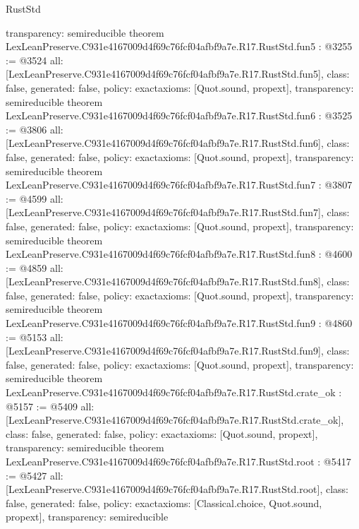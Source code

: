 \begin{lexlean}{RustStd}
\begin{coremodule}
{  transparency: semireducible
}
theorem LexLeanPreserve.C931e4167009d4f69c76fcf04afbf9a7e.R17.RustStd.fun5 : @3255 := @3524 {
  all: [LexLeanPreserve.C931e4167009d4f69c76fcf04afbf9a7e.R17.RustStd.fun5],
  class: false,
  generated: false,
  policy: exact{axioms: [Quot.sound, propext]},
  transparency: semireducible
}
theorem LexLeanPreserve.C931e4167009d4f69c76fcf04afbf9a7e.R17.RustStd.fun6 : @3525 := @3806 {
  all: [LexLeanPreserve.C931e4167009d4f69c76fcf04afbf9a7e.R17.RustStd.fun6],
  class: false,
  generated: false,
  policy: exact{axioms: [Quot.sound, propext]},
  transparency: semireducible
}
theorem LexLeanPreserve.C931e4167009d4f69c76fcf04afbf9a7e.R17.RustStd.fun7 : @3807 := @4599 {
  all: [LexLeanPreserve.C931e4167009d4f69c76fcf04afbf9a7e.R17.RustStd.fun7],
  class: false,
  generated: false,
  policy: exact{axioms: [Quot.sound, propext]},
  transparency: semireducible
}
theorem LexLeanPreserve.C931e4167009d4f69c76fcf04afbf9a7e.R17.RustStd.fun8 : @4600 := @4859 {
  all: [LexLeanPreserve.C931e4167009d4f69c76fcf04afbf9a7e.R17.RustStd.fun8],
  class: false,
  generated: false,
  policy: exact{axioms: [Quot.sound, propext]},
  transparency: semireducible
}
theorem LexLeanPreserve.C931e4167009d4f69c76fcf04afbf9a7e.R17.RustStd.fun9 : @4860 := @5153 {
  all: [LexLeanPreserve.C931e4167009d4f69c76fcf04afbf9a7e.R17.RustStd.fun9],
  class: false,
  generated: false,
  policy: exact{axioms: [Quot.sound, propext]},
  transparency: semireducible
}
theorem LexLeanPreserve.C931e4167009d4f69c76fcf04afbf9a7e.R17.RustStd.crate_ok : @5157 := @5409 {
  all: [LexLeanPreserve.C931e4167009d4f69c76fcf04afbf9a7e.R17.RustStd.crate_ok],
  class: false,
  generated: false,
  policy: exact{axioms: [Quot.sound, propext]},
  transparency: semireducible
}
theorem LexLeanPreserve.C931e4167009d4f69c76fcf04afbf9a7e.R17.RustStd.root : @5417 := @5427 {
  all: [LexLeanPreserve.C931e4167009d4f69c76fcf04afbf9a7e.R17.RustStd.root],
  class: false,
  generated: false,
  policy: exact{axioms: [Classical.choice, Quot.sound, propext]},
  transparency: semireducible
}


\end{coremodule}
\end{lexlean}
